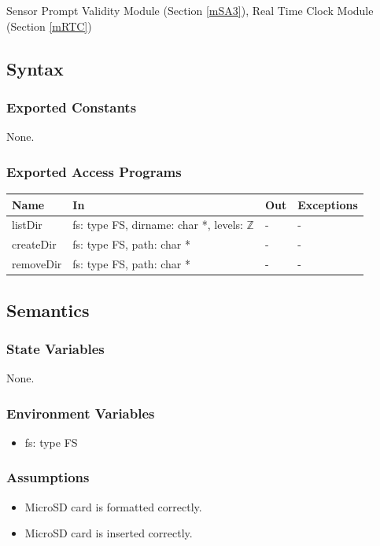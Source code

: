 \documentclass[12pt, titlepage]{article}
\begin{document}
Sensor Prompt Validity Module (Section \ref{mSA3}), Real Time Clock Module (Section \ref{mRTC})    %

\subsection{Syntax}

\subsubsection{Exported Constants}

None.

\subsubsection{Exported Access Programs}

\begin{center}
\begin{tabular}{p{2cm} p{4cm} p{3.5cm} p{4cm}}
\hline
\textbf{Name} & \textbf{In} & \textbf{Out} & \textbf{Exceptions} \\
\hline
listDir & fs: type FS, dirname: char *, levels: $\mathbb{Z}$ & - & - \\
createDir & fs: type FS, path: char * & - & - \\
removeDir & fs: type FS, path: char * & - & - \\
\hline
\end{tabular}
\end{center}

\subsection{Semantics}

\subsubsection{State Variables}

None.

\subsubsection{Environment Variables}
\begin{itemize}
\item fs: type FS
\end{itemize}

\subsubsection{Assumptions}
\begin{itemize}
\item MicroSD card is formatted correctly.
\item MicroSD card is inserted correctly.
\end{itemize}
\end{document}
